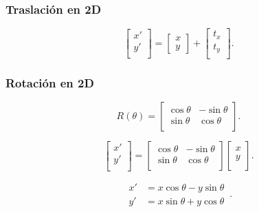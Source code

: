\begin{frame}
    \frametitle{Traslación en 2D}
    \begin{equation*}
        {\displaystyle {\begin{bmatrix}x'\\y'\\\end{bmatrix}}={\begin{bmatrix} x\\y\end{bmatrix}}+{\begin{bmatrix}t_x\\t_y\\\end{bmatrix}}.}
    \end{equation*}
\end{frame}

\begin{frame}
    \frametitle{Rotación en 2D}
    \begin{equation*}
        {\displaystyle R(\theta )={\begin{bmatrix}\cos \theta &-\sin \theta \\\sin \theta &\cos \theta \\\end{bmatrix}}.}
    \end{equation*}

    \begin{equation*}
        {\displaystyle {\begin{bmatrix}x'\\y'\\\end{bmatrix}}={\begin{bmatrix}\cos \theta &-\sin \theta \\\sin \theta &\cos \theta \\\end{bmatrix}}{\begin{bmatrix}x\\y\\\end{bmatrix}}.}
    \end{equation*}

    \begin{equation*}
        {\displaystyle {\begin{aligned}x'&=x\cos \theta -y\sin \theta \,\\y'&=x\sin \theta +y\cos \theta \,\end{aligned}}.}
    \end{equation*}

\end{frame}


